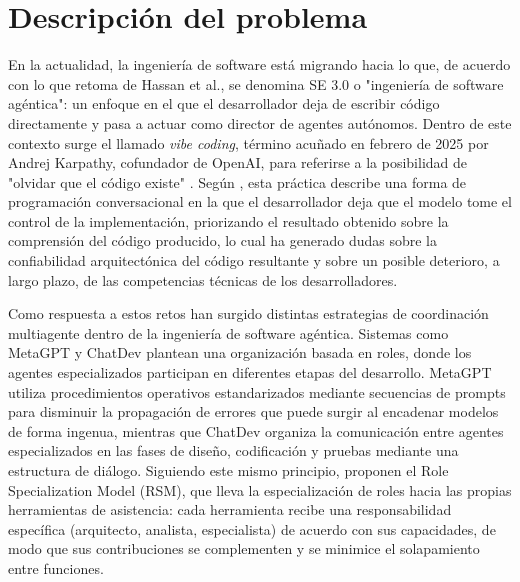 \section{Descripción del problema}
\label{sec:descripcion-problema}


En la actualidad, la ingeniería de software está migrando hacia lo que, de acuerdo con lo que retoma \textcite{fernandezyfernandez2025rsm} de Hassan et al., se denomina SE 3.0 o "ingeniería de software agéntica": un enfoque en el que el desarrollador deja de escribir código directamente y pasa a actuar como director de agentes autónomos. Dentro de este contexto surge el llamado \textit{vibe coding}, término acuñado en febrero de 2025 por Andrej Karpathy, cofundador de OpenAI, para referirse a la posibilidad de "olvidar que el código existe" \parencite{bbc2026vibecoding}. Según \textcite{fernandezyfernandez2025rsm}, esta práctica describe una forma de programación conversacional en la que el desarrollador deja que el modelo tome el control de la implementación, priorizando el resultado obtenido sobre la comprensión del código producido, lo cual ha generado dudas sobre la confiabilidad arquitectónica del código resultante y sobre un posible deterioro, a largo plazo, de las competencias técnicas de los desarrolladores.

Como respuesta a estos retos han surgido distintas estrategias de coordinación multiagente dentro de la ingeniería de software agéntica. Sistemas como MetaGPT \parencite{hong2024metagpt} y ChatDev \parencite{qian2024chatdev} plantean una organización basada en roles, donde los agentes especializados participan en diferentes etapas del desarrollo. MetaGPT utiliza procedimientos operativos estandarizados mediante secuencias de prompts para disminuir la propagación de errores que puede surgir al encadenar modelos de forma ingenua, mientras que ChatDev organiza la comunicación entre agentes especializados en las fases de diseño, codificación y pruebas mediante una estructura de diálogo. Siguiendo este mismo principio, \textcite{fernandezyfernandez2025rsm} proponen el Role Specialization Model (RSM), que lleva la especialización de roles hacia las propias herramientas de asistencia: cada herramienta recibe una responsabilidad específica (arquitecto, analista, especialista) de acuerdo con sus capacidades, de modo que sus contribuciones se complementen y se minimice el solapamiento entre funciones.

